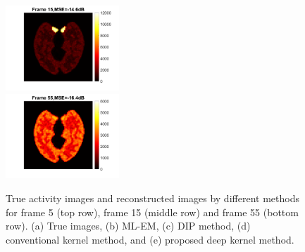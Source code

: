 \documentclass[]{IEEETran}
\begin{document}
\begin{figure}[t]
{\begin{minipage}[t]{0.18\linewidth}
				\includegraphics[trim=2cm 1cm 3.4cm 0cm, clip, height=3.2cm]{Frame15_KEM_best_large.png}\\
				\includegraphics[trim=2cm 1cm 3.4cm 0cm, clip, height=3.2cm]{Frame55_KEM_best_large.png}\\
			\end{minipage}%
		}%
		\caption{True activity images and reconstructed images by different methods for frame 5 (top row), frame 15 (middle row) and frame 55 (bottom row). (a) True images, (b) ML-EM, (c) DIP method, (d) conventional kernel method, and (e) proposed deep kernel method.}
		\label{fig:Rec}
	\end{figure}
\end{document}

